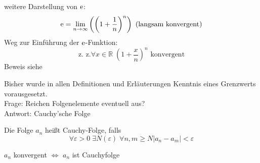 %
\noindent weitere Darstellung von $\operatorname{e}$:
\begin{equation*}
  \operatorname{e} = \lim_{n \rightarrow \infty} \left( \left(1+\frac 1 n\right)^n \right)\text{ (langsam konvergent)}
\end{equation*}
%
Weg zur Einführung der $\operatorname{e}$-Funktion:
\begin{equation*}
  \text{z. z.} \forall x \in \mathbb{R}\; \left( 1 + \frac x n \right)^n \text{ konvergent}
\end{equation*}
Beweis siehe \cite[S. 32]{bornemann}

\begin{note}
  Bisher wurde in allen Definitionen und Erläuterungen Kenntnis eines Grenzwerts vorausgesetzt.\\
  Frage: Reichen Folgenelemente eventuell aus?\\
  Antwort: Cauchy'sche Folge
\end{note}

\begin{definition}
  Die Folge $a_n$ heißt Cauchy-Folge, falls
  \[ \forall \varepsilon > 0\; \exists N(\varepsilon)\; \forall n,m \geq N \left| a_n-a_m \right| < \varepsilon \]
\end{definition}

\begin{proposition}
  $a_n$ konvergent $\Leftrightarrow$ $a_n$ ist Cauchyfolge
\end{proposition}


